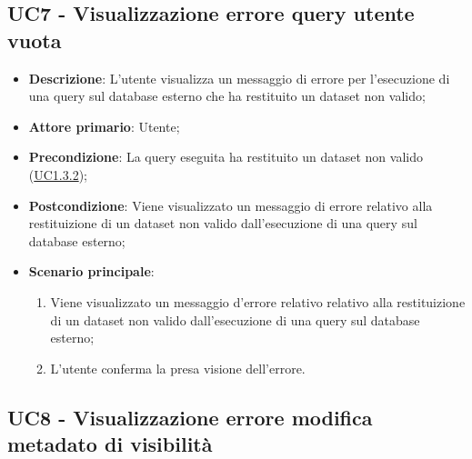 \subsection{UC7 - Visualizzazione errore query utente vuota}
\label{sub:uc9}
\begin{itemize}
    \item \textbf{Descrizione}: L'utente visualizza un messaggio di errore per l'esecuzione di una query sul database 
    esterno che ha restituito un dataset non valido;

    \item \textbf{Attore primario}: Utente;
    
    \item \textbf{Precondizione}:   La query eseguita ha restituito un dataset non valido 
    (\hyperref[par:uc1.3.2]{UC1.3.2});

    \item \textbf{Postcondizione}:   Viene visualizzato un messaggio di errore relativo alla restituizione di un dataset non valido dall'esecuzione di una query sul database esterno;
    
    \item \textbf{Scenario principale}:
    \begin{enumerate}
        \item Viene visualizzato un messaggio d'errore relativo relativo alla restituizione di un dataset non valido 
        dall'esecuzione di una query sul database esterno;
        \item L'utente conferma la presa visione dell'errore.
    \end{enumerate}

\end{itemize}

\subsection{UC8 - Visualizzazione errore modifica metadato di visibilità}
\label{sub:uc10}

